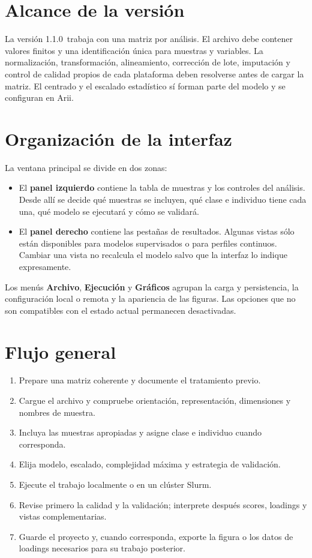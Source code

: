 \documentclass[11pt,a4paper,openany]{report}
\newcommand{\AriiVersion}{1.1.0}
\newcommand{\menu}[1]{\textbf{#1}}
\begin{document}
\section{Alcance de la versión}

La versión \AriiVersion\ trabaja con una matriz por análisis. El archivo debe
contener valores finitos y una identificación única para muestras y variables.
La normalización, transformación, alineamiento, corrección de lote, imputación y
control de calidad propios de cada plataforma deben resolverse antes de cargar
la matriz. El centrado y el escalado estadístico sí forman parte del modelo y se
configuran en Arii.

\section{Organización de la interfaz}

La ventana principal se divide en dos zonas:

\begin{itemize}
  \item El \textbf{panel izquierdo} contiene la tabla de muestras y los
  controles del análisis. Desde allí se decide qué muestras se incluyen, qué
  clase e individuo tiene cada una, qué modelo se ejecutará y cómo se validará.
  \item El \textbf{panel derecho} contiene las pestañas de resultados. Algunas
  vistas sólo están disponibles para modelos supervisados o para perfiles
  continuos. Cambiar una vista no recalcula el modelo salvo que la interfaz lo
  indique expresamente.
\end{itemize}

Los menús \menu{Archivo}, \menu{Ejecución} y \menu{Gráficos} agrupan la carga y
persistencia, la configuración local o remota y la apariencia de las figuras.
Las opciones que no son compatibles con el estado actual permanecen
desactivadas.

\newpage

\section{Flujo general}

\begin{enumerate}[leftmargin=*]
  \item Prepare una matriz coherente y documente el tratamiento previo.
  \item Cargue el archivo y compruebe orientación, representación, dimensiones
  y nombres de muestra.
  \item Incluya las muestras apropiadas y asigne clase e individuo cuando
  corresponda.
  \item Elija modelo, escalado, complejidad máxima y estrategia de validación.
  \item Ejecute el trabajo localmente o en un clúster Slurm.
  \item Revise primero la calidad y la validación; interprete después scores,
  loadings y vistas complementarias.
  \item Guarde el proyecto y, cuando corresponda, exporte la figura o los datos
  de loadings necesarios para su trabajo posterior.
\end{enumerate}
\end{document}
